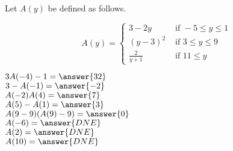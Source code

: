 \documentclass{ximera}
\author{Lee Wayand}
\begin{document}
\begin{exercise}




Let $A(y)$ be defined as follows.

\[
A(y) = 
\begin{cases}
  3 - 2y & \text{ if } -5 \le y \leq 1 \\
  (y-3)^2 & \text{ if } 3 \le y \leq 9 \\
  \frac{2}{y+1} & \text{ if } 11 \le y 
\end{cases}
\]


$3 A(-4) - 1 = \answer{32}$ \\


$3 - A(-1)  = \answer{-2}$ \\


$A(-2) A(4) = \answer{7}$ \\


$A(5) - A(1) = \answer{3}$ \\


$A(9-9)(A(9) - 9) = \answer{0}$ \\  


$A(-6) = \answer{DNE}$ \\


$A(2) = \answer{DNE}$ \\


$A(10) = \answer{DNE}$ \\


\end{exercise}
\end{document}
